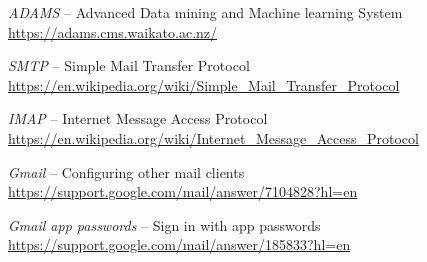 %

\begin{thebibliography}{999}

		\textit{ADAMS} -- Advanced Data mining and Machine learning System \\
		\url{https://adams.cms.waikato.ac.nz/}{}

        \textit{SMTP} -- Simple Mail Transfer Protocol \\
        \url{https://en.wikipedia.org/wiki/Simple_Mail_Transfer_Protocol}{}

        \textit{IMAP} -- Internet Message Access Protocol \\
        \url{https://en.wikipedia.org/wiki/Internet_Message_Access_Protocol}{}

	 	\textit{Gmail} -- Configuring other mail clients \\
		\url{https://support.google.com/mail/answer/7104828?hl=en}{}

	 	\textit{Gmail app passwords} -- Sign in with app passwords \\
		\url{https://support.google.com/mail/answer/185833?hl=en}{}

\end{thebibliography}
